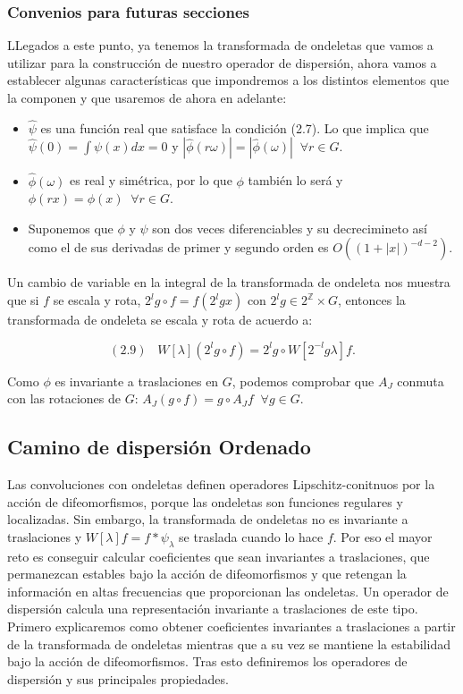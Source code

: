 \medskip


\subsubsection{Convenios para futuras secciones}

\noindent LLegados a este punto, ya tenemos la transformada de ondeletas que vamos a utilizar para la construcción de nuestro operador de dispersión, ahora vamos a establecer algunas características que impondremos a los distintos elementos que la componen y que usaremos de ahora en adelante: 

\begin{itemize}
    \item $\widehat{\psi}$ es una función real que satisface la condición (2.7). Lo que implica que $\widehat{\psi}(0)=\int \psi(x)dx=0$ y $|\widehat{\phi}(r\omega)|=|\widehat{\phi}(\omega)| \;\; \forall r\in G$.
    \item $\widehat{\phi}(\omega)$ es real y simétrica, por lo que $\phi$ también lo será y $\phi(rx)=\phi(x) \;\; \forall r \in G$. 
    \item Suponemos que $\phi$ y $\psi$ son dos veces diferenciables y su decrecimineto así como el de sus derivadas de primer y segundo orden es $O((1+|x|)^{-d-2})$.
\end{itemize}

\medskip

\noindent Un cambio de variable en la integral de la transformada de ondeleta nos muestra que si $f$ se escala y rota, $2^lg \circ f=f(2^lgx)$ con $2^lg \in 2^{\mathbb{Z}} \times G$, entonces la transformada de ondeleta se escala y rota de acuerdo a: 

$$(2.9) \;\;\; W[\lambda](2^lg\circ f)=2^lg \circ W[2^{-l}g\lambda]f.$$

\medskip

\noindent Como $\phi$ es invariante a traslaciones en $G$, podemos comprobar que $A_J$ conmuta con las rotaciones de $G$: $A_J(g\circ f)=g\circ A_J f \;\; \forall g \in G$.

\subsection{Camino de dispersión Ordenado}

\noindent Las convoluciones con ondeletas definen operadores Lipschitz-conitnuos por la acción de difeomorfismos, porque las ondeletas son funciones regulares y localizadas. Sin embargo, la transformada de ondeletas no es invariante a traslaciones y $W[\lambda]f=f\ast\psi_\lambda$ se traslada cuando lo hace $f$. Por eso el mayor reto es conseguir calcular coeficientes que sean invariantes a traslaciones, que permanezcan estables bajo la acción de difeomorfismos y que retengan la información en altas frecuencias que proporcionan las ondeletas. Un operador de dispersión calcula una representación invariante a traslaciones de este tipo. Primero explicaremos como obtener coeficientes invariantes a traslaciones a partir de la transformada de ondeletas mientras que a su vez se mantiene la estabilidad bajo la acción de difeomorfismos. Tras esto definiremos los operadores de dispersión y sus principales propiedades.

